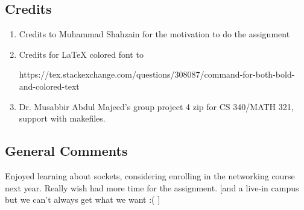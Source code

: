\documentclass[a4paper]{article}
\begin{document}
    \subsection{Credits}
        \begin{enumerate}
            \item Credits to Muhammad Shahzain for the motivation to do the assignment
            
            \item Credits for \LaTeX{} colored font to 
            \begin{spverbatim}
https://tex.stackexchange.com/questions/308087/command-for-both-bold-and-colored-text
            \end{spverbatim}
            
            \item Dr. Musabbir Abdul Majeed's group project 4 zip for CS 340/MATH 321, support with makefiles. 
        \end{enumerate}
    \subsection{General Comments}
        Enjoyed learning about sockets, considering enrolling in the networking course next year. Really wish had more time for the assignment. [and a live-in campus but we can't always get what we want :( ] 
\end{document}
